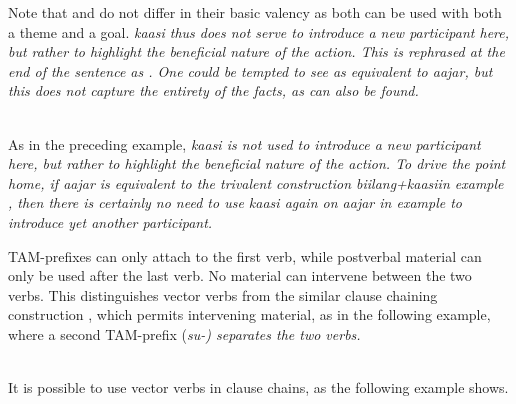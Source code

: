 Note that   and  do not differ in their basic valency as both can be used with both a theme and a goal. \em kaasi \em thus does not serve to introduce a new participant here, but rather to highlight the beneficial nature of the action. This is rephrased at the end of the sentence as . One could be tempted to see  as equivalent to \em aajar\em, but this does not capture the entirety of the facts, as  can also be found.

 \\
As in the preceding example, \em kaasi \em is not used to introduce a new participant here, but rather to highlight the beneficial nature of the action. To drive the point home, if \em aajar \em is equivalent to the trivalent construction \em biilang+kaasi\em in example , then there is certainly no need to use \em kaasi \em again on \em aajar \em in example  to introduce yet another participant.

TAM-prefixes can only attach to the first verb, while postverbal material can only be used after the last verb. No material can intervene between the two verbs. This distinguishes vector verbs from  the similar clause chaining construction , which permits intervening material, as in the following example, where a second TAM-prefix (\em su-\em) separates the two verbs.
 


 \\
It is possible to use vector verbs in clause chains, as the following example shows.

\\

